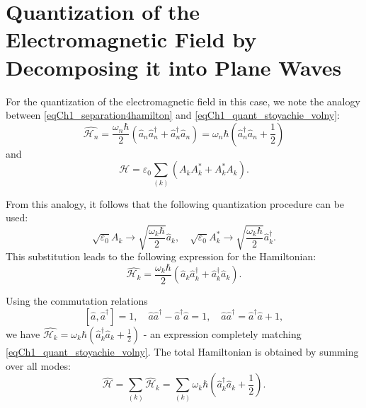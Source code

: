 \section{Quantization of the Electromagnetic Field by Decomposing it into Plane Waves}
For the quantization of the electromagnetic field in this case, we note the analogy between \eqref{eqCh1_separation4hamilton} and \eqref{eqCh1_quant_stoyachie_volny}:
\[
\hat{\mathcal{H}_n} = 
\frac{\omega_n \hbar}{2}
\left(\hat{a}_n \hat{a}_n^{\dag} + \hat{a}_n^{\dag} \hat{a}_n\right)
=
\omega_n \hbar 
\left(\hat{a}_n^{\dag} \hat{a}_n + \frac{1}{2}\right)
\]
and
\[
\mathcal{H} = \varepsilon_0 \sum_{(k)} 
\left(A_k A_k^{*} + A_k^{*} A_k \right).
\]

From this analogy, it follows that the following quantization procedure can be used:
\[
\sqrt{\varepsilon_0}A_k \rightarrow \sqrt{\frac{\omega_k \hbar}{2}}
\hat{a}_k, \quad
\sqrt{\varepsilon_0}A_k^{*} \rightarrow \sqrt{\frac{\omega_k \hbar}{2}}
\hat{a}_k^{\dag}.
\]
This substitution leads to the following expression for the Hamiltonian:
\[
\hat{\mathcal{H}_k} = \frac{\omega_k \hbar}{2} 
\left(\hat{a}_k \hat{a}_k^{\dag} + \hat{a}_k^{\dag} \hat{a}_k\right).
\]

Using the commutation relations
\[
\left[\hat{a}, \hat{a}^{\dag} \right] = 1, \quad
\hat{a} \hat{a}^{\dag} - \hat{a}^{\dag}\hat{a} = 1, \quad
\hat{a} \hat{a}^{\dag} = \hat{a}^{\dag}\hat{a} + 1,
\]
we have
\(
\hat{\mathcal{H}_k} = \omega_k \hbar 
\left(\hat{a}_k^{\dag} \hat{a}_k + \frac{1}{2}\right)
\) - 
an expression completely matching \eqref{eqCh1_quant_stoyachie_volny}.
The total Hamiltonian is obtained by summing over all modes:
\begin{equation}
\hat{\mathcal{H}} = \sum_{(k)} \hat{\mathcal{H}}_k = \sum_{(k)} 
\omega_k \hbar \left(\hat{a}_k^{\dag} \hat{a}_k + \frac{1}{2}\right).
\end{equation}

